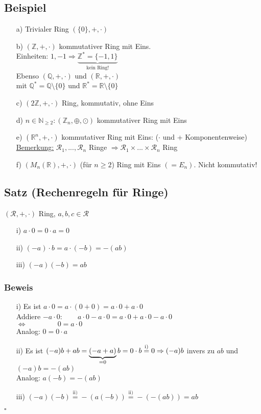\documentclass[12pt,titlepage, pdf]{article}
\newcommand{\R}{\mathds{R}}
\newcommand{\uline}[1]{\underline{#1}}
\renewcommand{\>}{\rightarrow}
\renewcommand{\*}{\cdot}
\begin{document}
	\subsection{Beispiel}
	\begin{itemize}
		\item[a)] Trivialer Ring $(\{0\},+,\cdot)$
		\item[b)] $(\mathds{Z}, +,\cdot)$ kommutativer Ring mit Eins. \\
		Einheiten: $1, -1\Rightarrow \underbrace{\mathds{Z}^* = \{-1,1\}}_{\text{kein Ring!}}$\\
		Ebenso $(\mathds{Q},+,\cdot)$ und $(\mathds{R},+,\cdot)$ \\
		mit $\mathds{Q}^* = \mathds{Q} \setminus \{0\}$ und $\mathds{R}^* =  \mathds{R} \setminus \{0\}$
		\item[c)] $(2\mathds{Z},+,\cdot)$ Ring, kommutativ, ohne Eins
		\item[d)] $n \in \mathds{N}_{\geq 2}: (\mathds{Z}_n, \oplus, \odot)$ kommutativer Ring mit Eins
		\item[e)] $(\R^n, + ,\cdot)$ kommutativer Ring mit Eins: ($\cdot$ und + Komponentenweise)\\
		\uline{Bemerkung:} $\mathcal{R}_1,...,\mathcal{R}_n$ Ringe $\Rightarrow \mathcal{R}_1 \times ... \times \mathcal{R}_n$ Ring
		\item[f)] $(M_n(\R),+, \cdot)$ (für $n\geq 2$) Ring mit Eins $(= E_n)$. Nicht kommutativ! 
	\end{itemize}
	\subsection{Satz (Rechenregeln für Ringe)}
	\label{4.3}
	$(\mathcal{R}, +,\cdot)$ Ring, $a,b,c \in \mathcal{R}$
	\begin{itemize}
		\item[i)] $a \cdot 0 = 0 \cdot a = 0$
		\item[ii)] $(-a) \cdot b = a \cdot (-b) = -(ab)$
		\item[iii)] $(-a)(-b) = ab$
	\end{itemize}	
	\subsubsection*{Beweis}
	\begin{itemize}
		\item[i)] Es ist $a \cdot 0 = a \cdot (0 + 0)= a \cdot 0 + a \cdot 0$\\
		Addiere $-a \cdot 0:\qquad a \cdot 0 - a \cdot 0 = a \cdot 0 + a \cdot 0 - a \cdot 0 $\\
		\noindent\hspace*{30mm}$\Leftrightarrow \qquad\qquad~0 = a \cdot 0$\\
		Analog: $0 = 0 \cdot a$
		\item[ii)] Es ist $(-a)b + ab = \underbrace{(-a+a)}_{=0}b = 0 \cdot b \overset{\textrm{i)}}{=} 0\\
		\Rightarrow (-a)b$ invers zu $ab$ und $(-a)b = -(ab)$ \\
		Analog: $a(-b) = -(ab)$
		\item[iii)] $(-a)(-b) \overset{\textrm{ii)}}{=} -(a(-b)) \overset{\textrm{ii)}}{=} -(-(ab)) = ab$
	\end{itemize}
	\hfill$\square$
\end{document}
